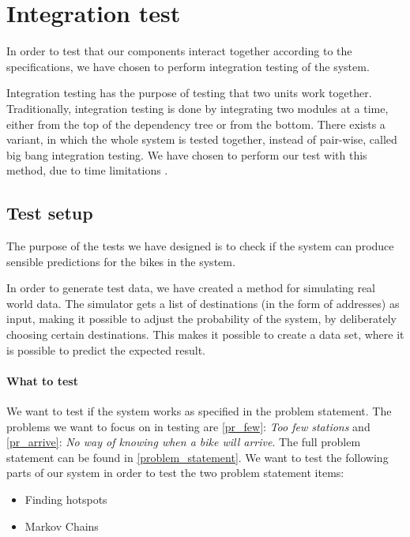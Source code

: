 \section{Integration test}

In order to test that our components interact together according to the specifications, we have chosen to perform integration testing of the system.

Integration testing has the purpose of testing that two units work together. 
Traditionally, integration testing is done by integrating two modules at a time, either from the top of the dependency tree or from the bottom.
There exists a variant, in which the whole system is tested together, instead of pair-wise, called big bang integration testing.
We have chosen to perform our test with this method, due to time limitations \cite{inttest}.

\subsection{Test setup}
The purpose of the tests we have designed is to check if the system can produce sensible predictions for the bikes in the system.

In order to generate test data, we have created a method for simulating real world data. 
The simulator gets a list of destinations (in the form of addresses) as input, making it possible to adjust the probability of the system, by deliberately choosing certain destinations.
This makes it possible to create a data set, where it is possible to predict the expected result.

\paragraph{What to test}
We want to test if the system works as specified in the problem statement.
The problems we want to focus on in testing are \ref{pr_few}: \textit{Too few stations} and \ref{pr_arrive}: \textit{No way of knowing when a bike will arrive}. 
The full problem statement can be found in \cref{problem_statement}.
We want to test the following parts of our system in order to test the two problem statement items:

\begin{itemize}
\item Finding hotspots 
\item Markov Chains
\end{itemize}

